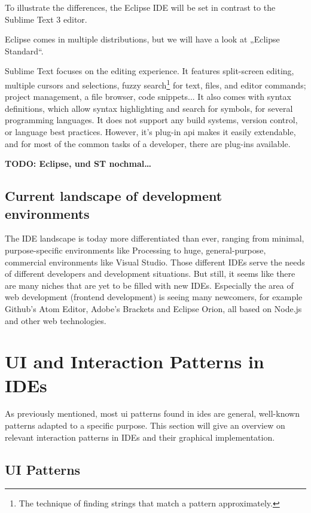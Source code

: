 To illustrate the differences, the Eclipse IDE will be set in contrast
to the Sublime Text 3 editor.

Eclipse comes in multiple distributions, but we will have a look at
„Eclipse Standard“.

Sublime Text focuses on the editing experience. It features split-screen
editing, multiple cursors and selections, fuzzy
search\footnote{The technique of finding strings that match a pattern approximately.}
for text, files, and editor commands; project management, a file
browser, code snippets... It also comes with syntax definitions, which
allow syntax highlighting and search for symbols, for several
programming languages. It does not support any build systems, version
control, or language best practices. However, it’s plug-in \ac{api}
makes it easily extendable, and for most of the common tasks of a
developer, there are plug-ins available.

\textbf{TODO: Eclipse, und ST nochmal\ldots{}}

\subsection{Current landscape of development
environments}\label{current-landscape-of-development-environments}

The IDE landscape is today more differentiated than ever, ranging from
minimal, purpose-specific environments like Processing to huge,
general-purpose, commercial environments like Visual Studio. Those
different IDEs serve the needs of different developers and development
situations. But still, it seems like there are many niches that are yet
to be filled with new IDEs. Especially the area of web development
(frontend development) is seeing many newcomers, for example Github’s
Atom Editor, Adobe’s Brackets and Eclipse Orion, all based on Node.js
and other web technologies.

\section{UI and Interaction Patterns in
IDEs}\label{ui-and-interaction-patterns-in-ides}

As previously mentioned, most \gls{ui} patterns found in \glspl{ide} are
general, well-known patterns adapted to a specific purpose. This section
will give an overview on relevant interaction patterns in IDEs and their
graphical implementation.

\subsection{UI Patterns}\label{ui-patterns}

